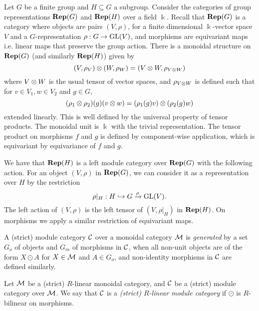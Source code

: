 \begin{example}
    Let $G$ be a finite group and $H \subseteq G$ a subgroup. Consider the categories of group representations $\operatorname{\mathbf{Rep}}(G)$ and $\operatorname{\mathbf{Rep}}(H)$ over a field $\Bbbk$. Recall that $\operatorname{\mathbf{Rep}}(G)$ is a category where objects are pairs $(V, \rho)$, for a finite dimensional $\Bbbk$-vector space $V$ and a $G$-representation $\rho: G \to \operatorname{GL}(V)$, and morphisms are equivariant maps i.e. linear maps that preserve the group action. There is a monoidal structure on $\operatorname{\mathbf{Rep}}(G)$ (and similarly $\operatorname{\mathbf{Rep}}(H)$) given by
    \[
        (V, \rho_V) \otimes (W, \rho_W) = (V \otimes W, \rho_{V \otimes W})
    \]
    where $V \otimes W$ is the usual tensor of vector spaces, and $\rho_{V \otimes W}$ is defined such that for $v \in V_1, w \in V_2$ and $g \in G$,
    \[
        (\rho_1 \otimes \rho_2)(g)(v \otimes w) = (\rho_1(g) v) \otimes (\rho_2(g) w)
    \]
    extended linearly. This is well defined by the universal property of tensor products. The monoidal unit is $\Bbbk$ with the trivial representation. The tensor product on morphisms $f$ and $g$ is defined by component-wise application, which is equivariant by equivariance of $f$ and $g$.

    We have that $\operatorname{\mathbf{Rep}}(H)$ is a left module category over $\operatorname{\mathbf{Rep}}(G)$ with the following action. For an object $(V,\rho)$ in $\operatorname{\mathbf{Rep}}(G)$, we can consider it as a representation over $H$ by the restriction
    \[
        \rho|_H: H \hookrightarrow G \xrightarrow{\rho} \operatorname{GL}(V).
    \]
    The left action of $(V, \rho)$ is the left tensor of $(V,\rho|_H)$ in $\operatorname{\mathbf{Rep}}(H)$. On morphisms we apply a similar restriction of equivariant maps.
\end{example}

\begin{definition}
    A (strict) module category $\mathcal{C}$ over a monoidal category $\mathcal{M}$ is \textit{generated} by a set $G_o$ of objects and $G_m$ of morphisms in $\mathcal{C}$, when all non-unit objects are of the form $X \odot A$ for $X \in \mathcal{M}$ and $A \in G_o$, and non-identity morphisms in $\mathcal{C}$ are defined similarly.
\end{definition}

\begin{definition}
    Let $\mathcal{M}$ be a (strict) $R$-linear monoidal category, and $\mathcal{C}$ be a (strict) module category over $\mathcal{M}$. We say that $\mathcal{C}$ is a \textit{(strict) $R$-linear module category} if $\odot$ is $R$-bilinear on morphisms.
\end{definition}

